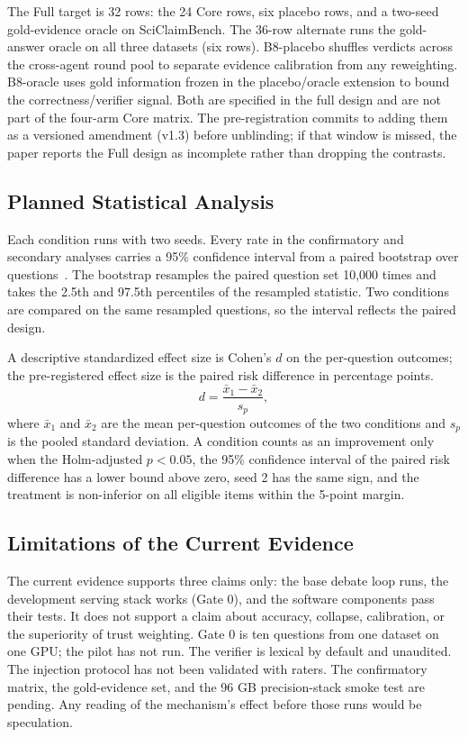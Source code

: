 \documentclass[a4paper,fleqn]{cas-sc}
\begin{document}
The Full target is 32 rows: the 24 Core rows, six placebo rows, and a two-seed gold-evidence oracle on SciClaimBench. The 36-row alternate runs the gold-answer oracle on all three datasets (six rows). B8-placebo shuffles verdicts across the cross-agent round pool to separate evidence calibration from any reweighting. B8-oracle uses gold information frozen in the placebo/oracle extension to bound the correctness/verifier signal. Both are specified in the full design and are not part of the four-arm Core matrix. The pre-registration commits to adding them as a versioned amendment (v1.3) before unblinding; if that window is missed, the paper reports the Full design as incomplete rather than dropping the contrasts.

\subsection{Planned Statistical Analysis}

Each condition runs with two seeds. Every rate in the confirmatory and secondary analyses carries a 95\% confidence interval from a paired bootstrap over questions~\cite{koehn2004statistical}. The bootstrap resamples the paired question set 10{,}000 times and takes the 2.5th and 97.5th percentiles of the resampled statistic. Two conditions are compared on the same resampled questions, so the interval reflects the paired design.

A descriptive standardized effect size is Cohen's $d$ on the per-question outcomes; the pre-registered effect size is the paired risk difference in percentage points.
\begin{equation}\label{eq:cohend}
  d = \frac{\bar{x}_1 - \bar{x}_2}{s_p},
\end{equation}
where $\bar{x}_1$ and $\bar{x}_2$ are the mean per-question outcomes of the two conditions and $s_p$ is the pooled standard deviation. A condition counts as an improvement only when the Holm-adjusted $p<0.05$, the 95\% confidence interval of the paired risk difference has a lower bound above zero, seed 2 has the same sign, and the treatment is non-inferior on all eligible items within the 5-point margin.

\subsection{Limitations of the Current Evidence}

The current evidence supports three claims only: the base debate loop runs, the development serving stack works (Gate 0), and the software components pass their tests. It does not support a claim about accuracy, collapse, calibration, or the superiority of trust weighting. Gate 0 is ten questions from one dataset on one GPU; the pilot has not run. The verifier is lexical by default and unaudited. The injection protocol has not been validated with raters. The confirmatory matrix, the gold-evidence set, and the 96 GB precision-stack smoke test are pending. Any reading of the mechanism's effect before those runs would be speculation.
\end{document}
